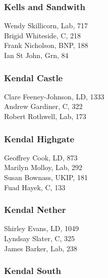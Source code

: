 \documentclass[a4paper,openany,10pt]{book}
\begin{document}
\subsubsection*{Kells and Sandwith}



Wendy Skillicorn, Lab, 717\\
Brigid Whiteside, C, 218\\
Frank Nicholson, BNP, 188\\
Ian St John, Grn, 84\\


\subsubsection*{Kendal Castle}



Clare Feeney-Johnson, LD, 1333\\
Andrew Gardiner, C, 322\\
Robert Rothwell, Lab, 173\\


\subsubsection*{Kendal Highgate}



Geoffrey Cook, LD, 873\\
Marilyn Molloy, Lab, 292\\
Susan Bownass, UKIP, 181\\
Fuad Hayek, C, 133\\


\subsubsection*{Kendal Nether}



Shirley Evans, LD, 1049\\
Lyndsay Slater, C, 325\\
James Barker, Lab, 238\\


\subsubsection*{Kendal South}
\end{document}
